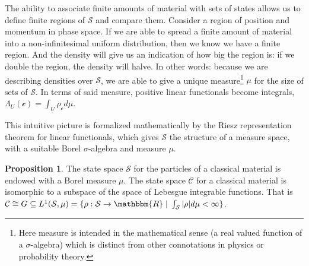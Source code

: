 \documentclass[aps,pra,10pt,twocolumn,floatfix,nofootinbib]{revtex4-1}
\numberwithin{equation}{section}
\theoremstyle{definition}
\newtheorem{prop}[equation]{Proposition}
\begin{document}
The ability to associate finite amounts of material with sets of states allows us to define finite regions of $\mathcal{S}$ and compare them. Consider a region of position and momentum in phase space. If we are able to spread a finite amount of material into a non-infinitesimal uniform distribution, then we know we have a finite region. And the density will give us an indication of how big the region is: if we double the region, the density will halve. In other words: because we are describing densities over $\mathcal{S}$, we are able to give a unique measure\footnote{Here measure is intended in the mathematical sense (a real valued function of a $\sigma$-algebra) which is distinct from other connotations in physics or probability theory.} $\mu$ for the size of sets of $\mathcal{S}$. In terms of said measure, positive linear functionals become integrals, $\Lambda_U (\mathcal{c}) = \int_U \rho_{\mathcal{c}} d \mu$.

This intuitive picture is formalized mathematically by the Riesz representation theorem for linear functionals, which gives $\mathcal{S}$ the structure of a measure space, with a suitable Borel $\sigma$-algebra and measure $\mu$.

\begin{prop}\label{integration}
	The state space $\mathcal{S}$ for the particles of a classical material is endowed with a Borel measure $\mu$. The state space $\mathcal{C}$ for a classical material is isomorphic to a subspace of the space of Lebesgue integrable functions. That is $\mathcal{C} \cong G \subseteq L^1(\mathcal{S}, \mu) = \{ \rho : \mathcal{S} \rightarrow \mathbbm{R} \; | \; \int_{\mathcal{S}} |\rho| d\mu < \infty \}$.
\end{prop}
\end{document}

